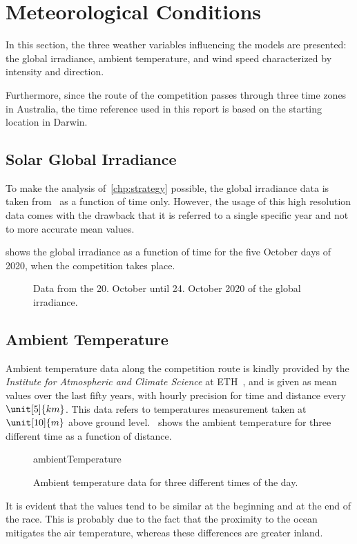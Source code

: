 \newpage
\section{Meteorological Conditions}
\label{sec:modelingWeatherData}
In this section, the three weather variables influencing the models are presented: the global irradiance, ambient temperature, and wind speed characterized by intensity and direction.

Furthermore, since the route of the competition passes through three time zones in Australia, the time reference used in this report is based on the starting location in Darwin.


\subsection{Solar Global Irradiance}
To make the analysis of~\cref{chp:strategy} possible, the global irradiance data is taken from~\cite{irradianceData:2022webpage} as a function of time only. However, the usage of this high resolution data comes with the drawback that it is referred to a single specific year and not to more accurate mean values.

 shows the global irradiance as a function of time for the five October days of 2020, when the competition takes place.
\begin{figure}[htbp]
	\centering
	
	\caption{Data from the 20. October until 24. October 2020 of the global irradiance.}
	\label{fig:irradianceRace2020}
\end{figure}


\subsection{Ambient Temperature}
Ambient temperature data along the competition route is kindly provided by the \textit{Institute for Atmospheric and Climate Science} at ETH~\cite{weatherData:2022webpage}, and is given as mean values over the last fifty years, with hourly precision for time and distance every $\unit[5]{km}$. This data refers to temperatures measurement taken at $\unit[10]{m}$ above ground level.~ shows the ambient temperature for three different time as a function of distance.
\begin{figure}[htbp]
	\centering
	\begin{externalize}{ambientTemperature}
		
	\end{externalize}
	\caption{Ambient temperature data for three different times of the day.}
	\label{fig:ambientTemperature}
\end{figure}
It is evident that the values tend to be similar at the beginning and at the end of the race. This is probably due to the fact that the proximity to the ocean mitigates the air temperature, whereas these differences are greater inland.


